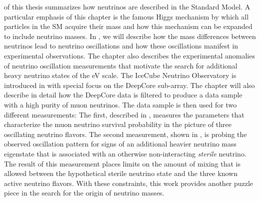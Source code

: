 of this thesis summarizes how neutrinos are described in the Standard Model.
A particular emphasis of this chapter is the famous Higgs mechanism by which all particles in the SM acquire their mass and how this mechanism can be expanded to include neutrino masses.
In , we will describe how the mass differences between neutrinos lead to neutrino oscillations and how these oscillations manifest in experimental observations.
The chapter also describes the experimental anomalies of neutrino oscillation measurements that motivate the search for additional heavy neutrino states of the eV scale.
The IceCube Neutrino Observatory is introduced in  with special focus on the DeepCore sub-array.
The chapter will also describe in detail how the DeepCore data is filtered to produce a data sample with a high purity of muon neutrinos.
The data sample is then used for two different measurements: The first, described in , measures the parameters that characterize the muon neutrino survival probability in the picture of three oscillating neutrino flavors.
The second measurement, shown in , is probing the observed oscillation pattern for signs of an additional heavier neutrino mass eigenstate that is associated with an otherwise non-interacting \emph{sterile} neutrino.
The result of this measurement places limits on the amount of mixing that is allowed between the hypothetical sterile neutrino state and the three known active neutrino flavors.
With these constraints, this work provides another puzzle piece in the search for the origin of neutrino masses.

